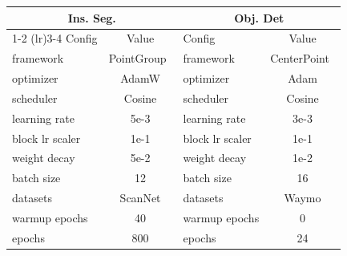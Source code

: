 \begin{tabular}{lclc}\toprule
\multicolumn{2}{c}{Ins. Seg.} &\multicolumn{2}{c}{Obj. Det} \\
\cmidrule(lr){1-2} \cmidrule(lr){3-4}
Config &Value &Config &Value \\\midrule
framework &PointGroup~\cite{jiang2020pointgroup} &framework &CenterPoint~\cite{yin2021center} \\
optimizer &AdamW &optimizer &Adam \\
scheduler &Cosine &scheduler &Cosine \\
learning rate &5e-3 &learning rate &3e-3 \\
block lr scaler &1e-1 &block lr scaler &1e-1 \\
weight decay &5e-2 &weight decay &1e-2 \\
batch size &12 &batch size &16 \\
datasets &ScanNet &datasets &Waymo \\
warmup epochs &40 &warmup epochs &0 \\
epochs &800 &epochs &24 \\
\bottomrule
\end{tabular}
